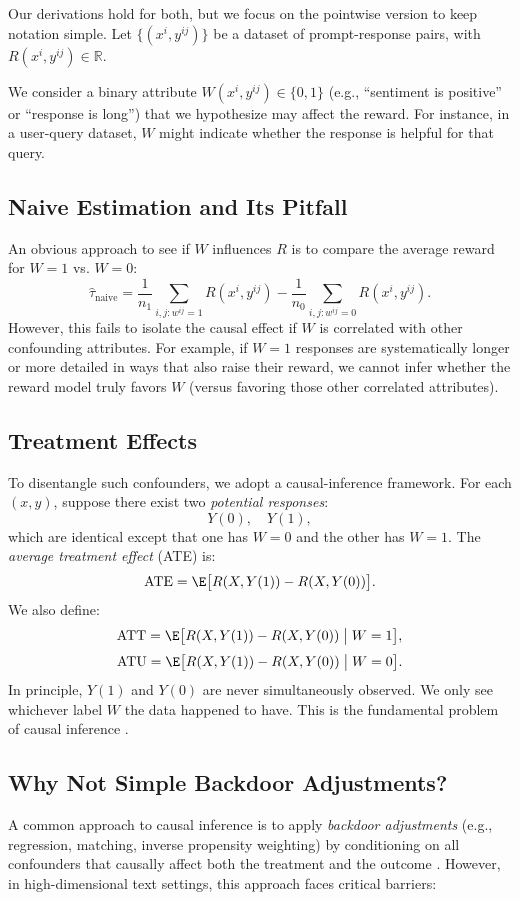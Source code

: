 Our derivations hold for both, but we focus on the pointwise version to keep notation simple. Let $\{(x^i, y^{ij})\}$ be a dataset of prompt-response pairs, with $R(x^i, y^{ij}) \in \mathbb{R}$.

We consider a binary attribute $W(x^i, y^{ij}) \in \{0,1\}$ (e.g., ``sentiment is positive'' or ``response is long'') that we hypothesize may affect the reward. For instance, in a user-query dataset, $W$ might indicate whether the response is helpful for that query.

\subsection{Naive Estimation and Its Pitfall}
An obvious approach to see if $W$ influences $R$ is to compare the average reward for $W=1$ vs. $W=0$:
\[
\hat{\tau}_{\text{naive}}
= \frac{1}{n_1}\sum_{i,j: w^{ij}=1} R(x^i, y^{ij})
- \frac{1}{n_0}\sum_{i,j: w^{ij}=0} R(x^i, y^{ij}).
\]
However, this fails to isolate the causal effect if $W$ is correlated with other confounding attributes. For example, if $W=1$ responses are systematically longer or more detailed in ways that also raise their reward, we cannot infer whether the reward model truly favors $W$ (versus favoring those other correlated attributes).

\subsection{Treatment Effects}
To disentangle such confounders, we adopt a causal-inference framework. For each $(x, y)$, suppose there exist two \emph{potential responses}:
\[
Y(0), \quad Y(1),
\]
which are identical except that one has $W=0$ and the other has $W=1$. The \emph{average treatment effect} (ATE) is:
\[
\text{ATE}
= \E\bigl[R(X, Y(1)) - R(X, Y(0))\bigr].
\]
We also define:
\[
\text{ATT} = \E\bigl[R(X, Y(1)) - R(X, Y(0)) \;\big|\; W=1\bigr],
\]
\[
\text{ATU} = \E\bigl[R(X, Y(1)) - R(X, Y(0)) \;\big|\; W=0\bigr].
\]
In principle, $Y(1)$ and $Y(0)$ are never simultaneously observed. We only see whichever label $W$ the data happened to have. This is the fundamental problem of causal inference \cite{imbens2015causal}.

\subsection{Why Not Simple Backdoor Adjustments?}
\label{sec:why_not_backdoor}
A common approach to causal inference is to apply \emph{backdoor adjustments} (e.g., regression, matching, inverse propensity weighting) by conditioning on all confounders that causally affect both the treatment and the outcome \cite{cinelli2024crash}. However, in high-dimensional text settings, this approach faces critical barriers:

